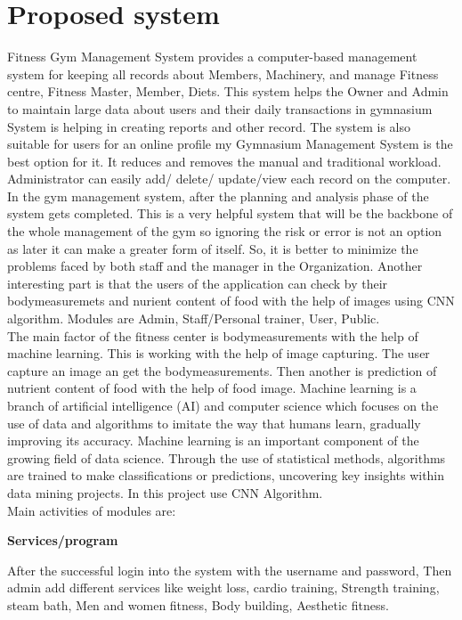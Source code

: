 \documentclass[a4paper,12pt,toc=flat]{report}
\begin{document}
{	\section{Proposed system}
	\hspace*{12pt}       Fitness Gym Management System provides a computer-based management system for keeping all records about Members, Machinery, and manage Fitness centre, Fitness Master, Member, Diets. This system helps the Owner and Admin to maintain large data about users and their daily transactions in gymnasium System is helping in creating reports and other record. The system is also suitable for users for an online profile my Gymnasium Management System is the best option for it. It reduces and removes the manual and traditional workload. Administrator can easily add/ delete/ update/view each record on the computer. In the gym management system, after the planning and analysis phase of the system gets completed. This is a very helpful system that will be the backbone of the whole management of the gym so ignoring the risk or error is not an option as later it can make a greater form of itself. So, it is better to minimize the problems faced by both staff and the manager in the Organization. Another interesting part is that the users of the application can check by their bodymeasuremets and nurient content of food with the help of images using CNN algorithm. Modules are Admin, Staff/Personal trainer, User, Public.\\
	\hspace*{12pt}
	The main factor of the fitness center is bodymeasurements with the help of machine learning. This is working with the help of image capturing. The user capture an image an get the bodymeasurements. Then another is prediction of nutrient content of food with the help of food image.  Machine learning is a branch of artificial intelligence (AI) and computer science which focuses on the use of data and algorithms to imitate the way that humans learn, gradually improving its accuracy. Machine learning is an important component of the growing field of data science. Through the use of statistical methods, algorithms are trained to make classifications or predictions, uncovering key insights within data mining projects. In this project  use CNN Algorithm.\\
		\pagebreak
	Main activities of  modules are:
	
	{\bf \hspace{-20pt} Services/program}
	
	
	After the successful login into the system with the username and password, Then admin add different services like weight loss, cardio training, Strength training, steam bath, Men and women fitness, Body building, Aesthetic fitness.\\
	
}
\end{document}
